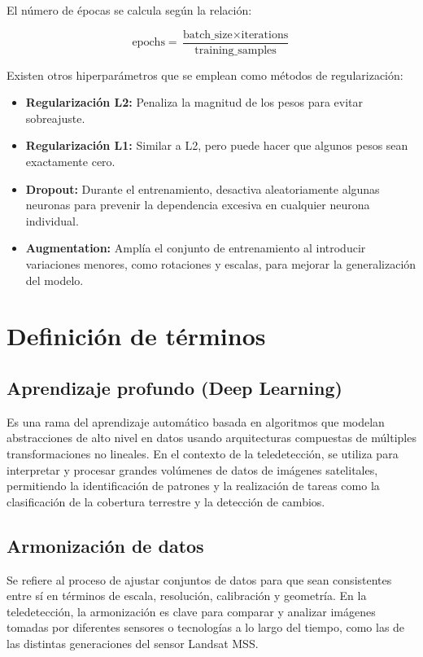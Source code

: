                 El número de épocas se calcula según la relación:
                
                \begin{equation}
                    \text{epochs} = \frac{\text{batch\_size} \times \text{iterations}}{\text{training\_samples}}
                \end{equation}
                
                Existen otros hiperparámetros que se emplean como métodos de regularización:
                
                \begin{itemize}
                    \item[-] \textbf{Regularización L2:} Penaliza la magnitud de los pesos para evitar sobreajuste.
                    \item[-] \textbf{Regularización L1:} Similar a L2, pero puede hacer que algunos pesos sean exactamente cero.
                    \item[-] \textbf{Dropout:} Durante el entrenamiento, desactiva aleatoriamente algunas neuronas para prevenir la dependencia excesiva en cualquier neurona individual.
                    \item[-] \textbf{Augmentation:} Amplía el conjunto de entrenamiento al introducir variaciones menores, como rotaciones y escalas, para mejorar la generalización del modelo.
                \end{itemize}
    \section{Definición de términos}
        \subsection{Aprendizaje profundo (Deep Learning)}
            Es una rama del aprendizaje automático basada en algoritmos que modelan abstracciones de alto nivel en datos usando arquitecturas compuestas de múltiples transformaciones no lineales. En el contexto de la teledetección, se utiliza para interpretar y procesar grandes volúmenes de datos de imágenes satelitales, permitiendo la identificación de patrones y la realización de tareas como la clasificación de la cobertura terrestre y la detección de cambios.
            
        \subsection{Armonización de datos}
            Se refiere al proceso de ajustar conjuntos de datos para que sean consistentes entre sí en términos de escala, resolución, calibración y geometría. En la teledetección, la armonización es clave para comparar y analizar imágenes tomadas por diferentes sensores o tecnologías a lo largo del tiempo, como las de las distintas generaciones del sensor Landsat MSS.
            
